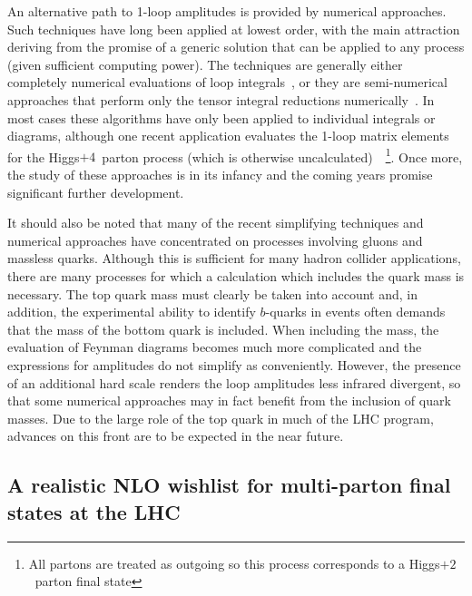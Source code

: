 \documentclass[12pt]{iopart}
\begin{document}
An alternative path to 1-loop amplitudes is provided by numerical approaches. Such
techniques have long been applied at lowest order, with the main attraction deriving
from the promise of a generic solution that can be applied to any process (given
sufficient computing power). The techniques are generally either completely numerical
evaluations of loop integrals~\cite{Ferroglia:2002mz,Anastasiou:2005cb}, or they
are semi-numerical approaches that perform only the tensor integral reductions
numerically~\cite{Giele:2004iy,Giele:2004ub,delAguila:2004nf,vanHameren:2005ed,Binoth:2005ff,Ellis:2005zh}.
In most cases these algorithms have only been applied to individual integrals or
diagrams, although one recent application evaluates the 1-loop matrix elements for
the Higgs$+4$~parton process (which is otherwise uncalculated)~\cite{Ellis:2005qe}~\footnote{
All partons are treated as outgoing so this process corresponds to a Higgs$+2$~parton final state}.
Once more, the study of these approaches is in its infancy and the coming years
promise significant further development.

It should also be noted that many of the recent simplifying techniques and numerical approaches
have concentrated on processes involving gluons and massless quarks. Although this is sufficient
for many hadron collider applications, there are many processes for which a calculation which
includes the quark mass is necessary. The top quark mass must clearly be taken into account and, in
addition, the experimental ability to identify $b$-quarks in events often demands that the mass of the
bottom quark is included. When including the mass, the evaluation of Feynman diagrams becomes much more
complicated and the expressions for amplitudes do not simplify as conveniently. However, the presence
of an additional hard scale renders the loop amplitudes less infrared divergent, so that some numerical
approaches may in fact benefit from the inclusion of quark masses. Due to the large role of the top quark
in much of the LHC program, advances on this front are to be expected in the near future.

\subsection{A realistic NLO wishlist for multi-parton final states at the LHC}
\label{sec:wishlist}

\setcounter{footnote}{0}
\end{document}
